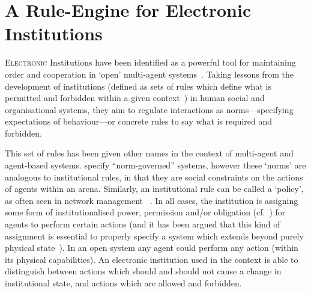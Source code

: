 \acresetall
\chapter{A Rule-Engine for Electronic Institutions}\label{ch:droolseinst}

\lettrine[lines=3]{E}{lectronic} Institutions have been identified as a powerful
tool for maintaining order and cooperation in `open' multi-agent
systems~\citep{Esteva2001,Artikis2009}. Taking lessons from the development of
institutions (defined as sets of rules which define what is permitted and
forbidden within a given context~\citep{Ostrom1990,North1990}) in human social and
organisational systems, they aim to regulate interactions as norms---specifying
expectations of behaviour---or concrete rules to say what is required and
forbidden.

This set of rules has been given other names in the context of multi-agent and
agent-based systems. \citet{Artikis2009} specify ``norm-governed'' systems,
however these `norms' are analogous to institutional rules, in that they are
social constraints on the actions of agents within an arena. Similarly, an
institutional rule can be called a `policy', as often seen in network
management ~\citep{Sloman1999}. In all cases, the institution is assigning
some form of institutionalised power, permission and/or
obligation (cf.~\citet{Jones1996}) for agents to perform certain actions (and it has
been argued that this kind of assignment is essential to properly specify a system which extends beyond purely physical state~\citep{Artikis2009a}).
In an open system any agent could perform any action (within its physical
capabilities). An electronic institution used in the context is able to
distinguish between actions which should and should not cause a change in
institutional state, and actions which are allowed and forbidden.



